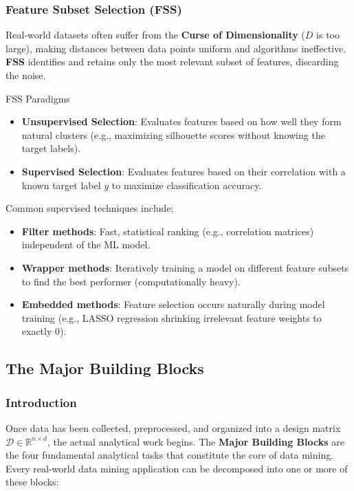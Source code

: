 \documentclass[11pt]{article}
\theoremstyle{smallexample}
\begin{document}
\subsubsection{Feature Subset Selection (FSS)}

Real-world datasets often suffer from the \textbf{Curse of Dimensionality} ($D$ is too large), making distances between data points uniform and algorithms ineffective. \textbf{FSS} identifies and retains only the most relevant subset of features, discarding the noise.

\begin{defbox}{FSS Paradigms}
    \begin{itemize}
        \item \textbf{Unsupervised Selection}: Evaluates features based on how well they form natural clusters (e.g., maximizing silhouette scores without knowing the target labels).
        \item \textbf{Supervised Selection}: Evaluates features based on their correlation with a known target label $y$ to maximize classification accuracy.
    \end{itemize}
\end{defbox}

\pagebreak

Common supervised techniques include:
\begin{itemize}
    \item \textbf{Filter methods}: Fast, statistical ranking (e.g., correlation matrices) independent of the ML model.
    \item \textbf{Wrapper methods}: Iteratively training a model on different feature subsets to find the best performer (computationally heavy).
    \item \textbf{Embedded methods}: Feature selection occurs naturally during model training (e.g., LASSO regression shrinking irrelevant feature weights to exactly $0$).
\end{itemize}



\subsection{The Major Building Blocks}

\subsubsection{Introduction}

Once data has been collected, preprocessed, and organized into a design matrix
$\mathcal{D} \in \mathbb{R}^{n \times d}$, the actual analytical work begins.
The \textbf{Major Building Blocks} are the four fundamental analytical tasks
that constitute the core of data mining. Every real-world data mining application
can be decomposed into one or more of these blocks:
\end{document}
